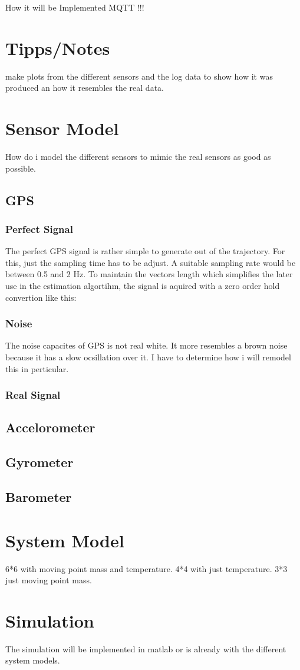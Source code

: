 How it will be Implemented
MQTT !!!
\section{Tipps/Notes}
make plots from the different sensors and the log data to show how it was 
produced an how it resembles the real data.


\section{Sensor Model}
How do i model the different sensors to mimic the real sensors as good as possible.

\subsection{GPS}
\subsubsection{Perfect Signal}
The perfect GPS signal is rather simple to generate out of the trajectory. For this, just the sampling time has to be adjust.
A suitable sampling rate would be between 0.5 and 2 Hz. To maintain the vectors length which simplifies the later use in the estimation algortihm,
the signal is aquired with a zero order hold convertion like this:


\subsubsection{Noise}
The noise capacites of GPS is not real white. It more resembles a brown noise because it has a slow ocsillation over it.
I have to determine how i will remodel this in perticular.

\subsubsection{Real Signal}
\subsection{Accelorometer}

\subsection{Gyrometer}
\subsection{Barometer}

\section{System Model}
6*6 with moving point mass and temperature.
4*4 with just temperature.
3*3 just moving point mass.

\section{Simulation}
The simulation will be implemented in matlab
or is already with the different system models.
